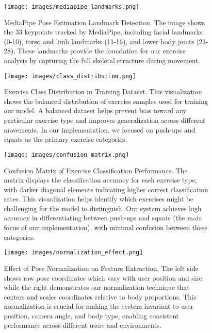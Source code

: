 \documentclass[11pt]{article}
\begin{document}
\begin{figure}[htbp]
    \centering
    \texttt{[image: images/mediapipe\_landmarks.png]}
    \caption{MediaPipe Pose Estimation Landmark Detection. The image shows the 33 keypoints tracked by MediaPipe, including facial landmarks (0-10), torso and limb landmarks (11-16), and lower body joints (23-28). These landmarks provide the foundation for our exercise analysis by capturing the full skeletal structure during movement.}
    \label{fig:mediapipe_landmarks}
\end{figure}

\begin{figure}[htbp]
    \centering
    \texttt{[image: images/class\_distribution.png]}
    \caption{Exercise Class Distribution in Training Dataset. This visualization shows the balanced distribution of exercise samples used for training our model. A balanced dataset helps prevent bias toward any particular exercise type and improves generalization across different movements. In our implementation, we focused on push-ups and squats as the primary exercise categories.}
    \label{fig:class_distribution_detail}
\end{figure}

\begin{figure}[htbp]
    \centering
    \texttt{[image: images/confusion\_matrix.png]}
    \caption{Confusion Matrix of Exercise Classification Performance. The matrix displays the classification accuracy for each exercise type, with darker diagonal elements indicating higher correct classification rates. This visualization helps identify which exercises might be challenging for the model to distinguish. Our system achieves high accuracy in differentiating between push-ups and squats (the main focus of our implementation), with minimal confusion between these categories.}
    \label{fig:confusion_matrix_detail}
\end{figure}

\begin{figure}[htbp]
    \centering
    \texttt{[image: images/normalization\_effect.png]}
    \caption{Effect of Pose Normalization on Feature Extraction. The left side shows raw pose coordinates which vary with user position and size, while the right demonstrates our normalization technique that centers and scales coordinates relative to body proportions. This normalization is crucial for making the system invariant to user position, camera angle, and body type, enabling consistent performance across different users and environments.}
    \label{fig:normalization}
\end{figure}
\end{document}
